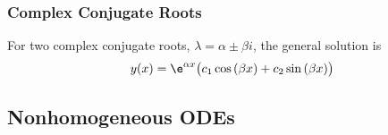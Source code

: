 \documentclass{article}
\begin{document}
\subsubsection{Complex Conjugate Roots}
For two complex conjugate roots, $\lambda = \alpha \pm \beta i$, the general solution is
\begin{equation*}
    y(x) = \e^{\alpha x}\bigl( c_1\cos{\left( \beta x \right)} + c_2 \sin{\left( \beta x \right)} \bigr)
\end{equation*}
\subsection{Nonhomogeneous ODEs}
\end{document}
